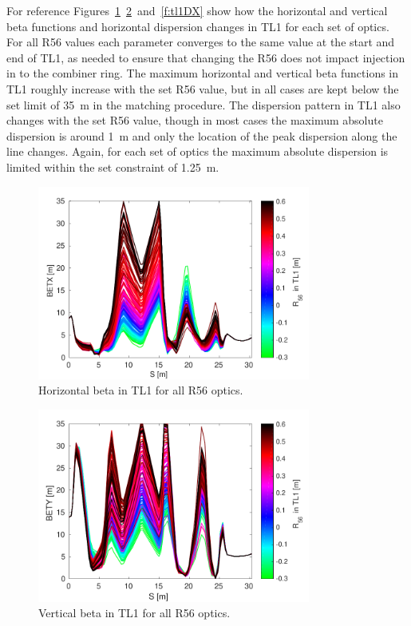 For reference Figures~\ref{f:tl1BETX}~\ref{f:tl1BETY}~and~\ref{f:tl1DX} show how the horizontal and vertical beta functions and horizontal dispersion changes in TL1 for each set of optics. For all R56 values each parameter converges to the same value at the start and end of TL1, as needed to ensure that changing the R56 does not impact injection in to the combiner ring. The maximum horizontal and vertical beta functions in TL1 roughly increase with the set R56 value, but in all cases are kept below the set limit of 35~m in the matching procedure. The dispersion pattern in TL1 also changes with the set R56 value, though in most cases the maximum absolute dispersion is around 1~m and only the location of the peak dispersion along the line changes. Again, for each set of optics the maximum absolute dispersion is limited within the set constraint of 1.25~m. 

\begin{figure}
  \centering
  \includegraphics[width=0.8\textwidth]{Figures/propagation/BETX}
  \caption{Horizontal beta in TL1 for all R56 optics.}
  \label{f:tl1BETX}
\end{figure}

\begin{figure}
  \centering
  \includegraphics[width=0.8\textwidth]{Figures/propagation/BETY}
  \caption{Vertical beta in TL1 for all R56 optics.}
  \label{f:tl1BETY}
\end{figure}

